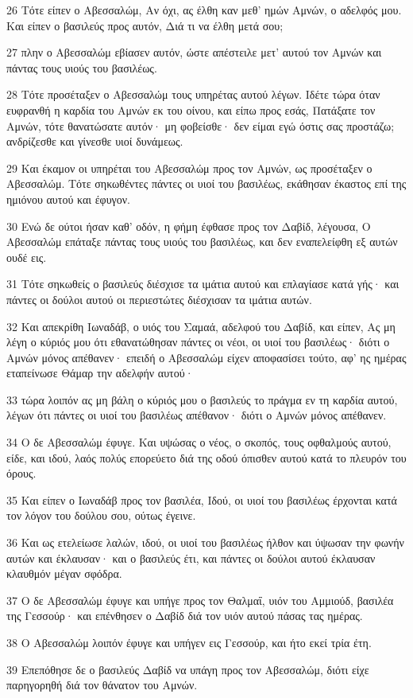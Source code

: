 \par 26 Τότε είπεν ο Αβεσσαλώμ, Αν όχι, ας έλθη καν μεθ' ημών Αμνών, ο αδελφός μου. Και είπεν ο βασιλεύς προς αυτόν, Διά τι να έλθη μετά σου;
\par 27 πλην ο Αβεσσαλώμ εβίασεν αυτόν, ώστε απέστειλε μετ' αυτού τον Αμνών και πάντας τους υιούς του βασιλέως.
\par 28 Τότε προσέταξεν ο Αβεσσαλώμ τους υπηρέτας αυτού λέγων. Ιδέτε τώρα όταν ευφρανθή η καρδία του Αμνών εκ του οίνου, και είπω προς εσάς, Πατάξατε τον Αμνών, τότε θανατώσατε αυτόν· μη φοβείσθε· δεν είμαι εγώ όστις σας προστάζω; ανδρίζεσθε και γίνεσθε υιοί δυνάμεως.
\par 29 Και έκαμον οι υπηρέται του Αβεσσαλώμ προς τον Αμνών, ως προσέταξεν ο Αβεσσαλώμ. Τότε σηκωθέντες πάντες οι υιοί του βασιλέως, εκάθησαν έκαστος επί της ημιόνου αυτού και έφυγον.
\par 30 Ενώ δε ούτοι ήσαν καθ' οδόν, η φήμη έφθασε προς τον Δαβίδ, λέγουσα, Ο Αβεσσαλώμ επάταξε πάντας τους υιούς του βασιλέως, και δεν εναπελείφθη εξ αυτών ουδέ εις.
\par 31 Τότε σηκωθείς ο βασιλεύς διέσχισε τα ιμάτια αυτού και επλαγίασε κατά γής· και πάντες οι δούλοι αυτού οι περιεστώτες διέσχισαν τα ιμάτια αυτών.
\par 32 Και απεκρίθη Ιωναδάβ, ο υιός του Σαμαά, αδελφού του Δαβίδ, και είπεν, Ας μη λέγη ο κύριός μου ότι εθανατώθησαν πάντες οι νέοι, οι υιοί του βασιλέως· διότι ο Αμνών μόνος απέθανεν· επειδή ο Αβεσσαλώμ είχεν αποφασίσει τούτο, αφ' ης ημέρας εταπείνωσε Θάμαρ την αδελφήν αυτού·
\par 33 τώρα λοιπόν ας μη βάλη ο κύριός μου ο βασιλεύς το πράγμα εν τη καρδία αυτού, λέγων ότι πάντες οι υιοί του βασιλέως απέθανον· διότι ο Αμνών μόνος απέθανεν.
\par 34 Ο δε Αβεσσαλώμ έφυγε. Και υψώσας ο νέος, ο σκοπός, τους οφθαλμούς αυτού, είδε, και ιδού, λαός πολύς επορεύετο διά της οδού όπισθεν αυτού κατά το πλευρόν του όρους.
\par 35 Και είπεν ο Ιωναδάβ προς τον βασιλέα, Ιδού, οι υιοί του βασιλέως έρχονται κατά τον λόγον του δούλου σου, ούτως έγεινε.
\par 36 Και ως ετελείωσε λαλών, ιδού, οι υιοί του βασιλέως ήλθον και ύψωσαν την φωνήν αυτών και έκλαυσαν· και ο βασιλεύς έτι, και πάντες οι δούλοι αυτού έκλαυσαν κλαυθμόν μέγαν σφόδρα.
\par 37 Ο δε Αβεσσαλώμ έφυγε και υπήγε προς τον Θαλμαΐ, υιόν του Αμμιούδ, βασιλέα της Γεσσούρ· και επένθησεν ο Δαβίδ διά τον υιόν αυτού πάσας τας ημέρας.
\par 38 Ο Αβεσσαλώμ λοιπόν έφυγε και υπήγεν εις Γεσσούρ, και ήτο εκεί τρία έτη.
\par 39 Επεπόθησε δε ο βασιλεύς Δαβίδ να υπάγη προς τον Αβεσσαλώμ, διότι είχε παρηγορηθή διά τον θάνατον του Αμνών.

